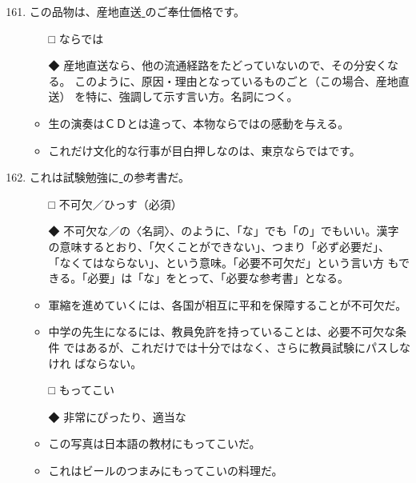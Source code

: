 \documentclass[
uplatex,
b5paper,
10pt,
dvipdfmx
]{jsbook}
\begin{document}
\begin{enumerate}
\setcounter{enumi}{160}

\item この品物は、産地直送\underline{     }のご奉仕価格です。
\begin{itemize}
\item[□] ならでは
\item[◆] 産地直送なら、他の流通経路をたどっていないので、その分安くなる。
	  このように、原因・理由となっているものごと（この場合、産地直送）
	  を特に、強調して示す言い方。名詞につく。
\end{itemize}
\begin{itemize}
\item 生の演奏はＣＤとは違って、本物ならではの感動を与える。
\item これだけ文化的な行事が目白押しなのは、東京ならではです。
\end{itemize}

\item これは試験勉強に\underline{    }の参考書だ。
\begin{itemize}
\item[□] 不可欠／ひっす（必須）
\item[◆] 不可欠な／の〈名詞〉、のように、「な」でも「の」でもいい。漢字
	  の意味するとおり、「欠くことができない」、つまり「必ず必要だ」、
	  「なくてはならない」、という意味。「必要不可欠だ」という言い方
	  もできる。「必要」は「な」をとって、「必要な参考書」となる。
\end{itemize}
\begin{itemize}
\item 軍縮を進めていくには、各国が相互に平和を保障することが不可欠だ。
\item 中学の先生になるには、教員免許を持っていることは、必要不可欠な条件
      ではあるが、これだけでは十分ではなく、さらに教員試験にパスしなけれ
      ばならない。
\end{itemize}

\begin{itemize}
\item[□] もってこい
\item[◆] 非常にぴったり、適当な
\end{itemize}
\begin{itemize}
\item この写真は日本語の教材にもってこいだ。
\item これはビールのつまみにもってこいの料理だ。
\end{itemize}


\end{enumerate}
\end{document}
